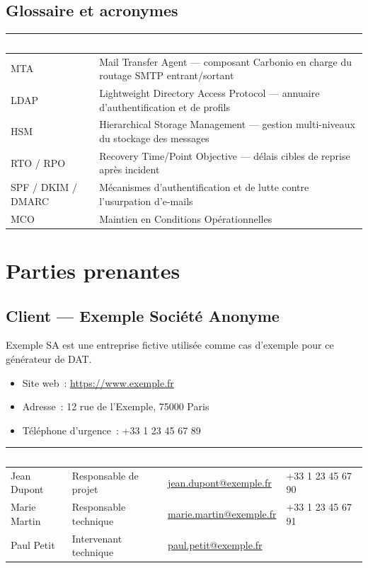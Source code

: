 \documentclass[11pt,a4paper]{report}
\newcommand{\tblhead}[1]{\textcolor{white}{\textbf{#1}}}
\begin{document}
\section{Glossaire et acronymes}
\begin{longtable}{|p{3.5cm}|p{9.5cm}|}
\hline
\rowcolor{primary}\tblhead{Terme} & \tblhead{Définition} \\
\hline
\endhead
MTA & Mail Transfer Agent --- composant Carbonio en charge du routage SMTP entrant/sortant \\
\hline
LDAP & Lightweight Directory Access Protocol --- annuaire d'authentification et de profils \\
\hline
HSM & Hierarchical Storage Management --- gestion multi-niveaux du stockage des messages \\
\hline
RTO / RPO & Recovery Time/Point Objective --- délais cibles de reprise après incident \\
\hline
SPF / DKIM / DMARC & Mécanismes d'authentification et de lutte contre l'usurpation d'e-mails \\
\hline
MCO & Maintien en Conditions Opérationnelles \\
\hline
\end{longtable}

\chapter{Parties prenantes}

\section{Client --- Exemple Société Anonyme}
Exemple SA est une entreprise fictive utilisée comme cas d'exemple pour ce générateur de DAT.\allowbreak{}

\begin{itemize}[nosep]
  \item Site web~: \url{https://www.exemple.fr }
  \item Adresse~: 12 rue de l'Exemple, 75000 Paris
  \item Téléphone d'urgence~: +33 1 23 45 67 89
\end{itemize}

\begin{longtable}{|p{3cm}|p{3cm}|p{4.3cm}|p{2.7cm}|}
\hline
\rowcolor{primary}\tblhead{Nom} & \tblhead{Rôle} & \tblhead{E-mail} & \tblhead{Téléphone} \\
\hline
\endhead
Jean Dupont & Responsable de projet & \href{mailto:jean.dupont@exemple.fr}{jean.\allowbreak{}dupont@\allowbreak{}exemple.\allowbreak{}fr} & +33 1 23 45 67 90 \\
\hline
Marie Martin & Responsable technique & \href{mailto:marie.martin@exemple.fr}{marie.\allowbreak{}martin@\allowbreak{}exemple.\allowbreak{}fr} & +33 1 23 45 67 91 \\
\hline
Paul Petit & Intervenant technique & \href{mailto:paul.petit@exemple.fr}{paul.\allowbreak{}petit@\allowbreak{}exemple.\allowbreak{}fr} &  \\
\hline
\end{longtable}
\end{document}
